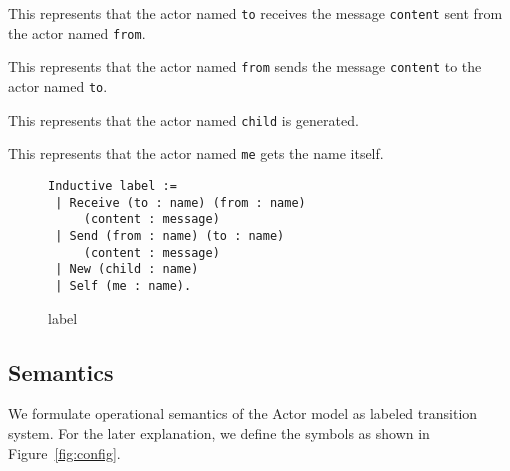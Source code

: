 
\begin{description}[style=nextline,leftmargin=12pt,parsep=0pt]
\item[\texttt{Receive (to : name) (from : name) \\ (content : message)}]
  This represents that the actor named \lstinline|to| receives the message \lstinline|content| sent from the actor named \lstinline|from|.
\item[\texttt{Send (from : name) (to : name) \\ (content : message)}]
  This represents that the actor named \lstinline|from| sends the message \lstinline|content| to the actor named \lstinline|to|.
\item[\texttt{New (child : name)}]
  This represents that the actor named \lstinline|child| is generated.
\item[\texttt{Self (me : name)}]
  This represents that the actor named \lstinline|me| gets the name itself.
\end{description}


\begin{figure}[t]
\begin{lstlisting}
Inductive label :=
 | Receive (to : name) (from : name)
     (content : message)
 | Send (from : name) (to : name)
     (content : message)
 | New (child : name)
 | Self (me : name).
\end{lstlisting}
\caption{label}\label{coq:label}
\end{figure}


\subsection{Semantics}

We formulate operational semantics of the Actor model as labeled transition system.
For the later explanation, we define the symbols as shown in Figure~\ref{fig:config}.

